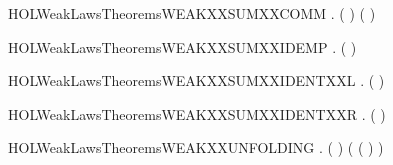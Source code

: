 \newcommand{\HOLWeakLawsTheoremsWEAKXXSUMXXASSOCXXR}{\UseVerbatim{HOLWeakLawsTheoremsWEAKXXSUMXXASSOCXXR}}
\begin{SaveVerbatim}{HOLWeakLawsTheoremsWEAKXXSUMXXCOMM}
\HOLTokenTurnstile{} \HOLSymConst{\HOLTokenForall{}} .  ( \HOLSymConst{\ensuremath{+}} ) ( \HOLSymConst{\ensuremath{+}} )
\end{SaveVerbatim}
\newcommand{\HOLWeakLawsTheoremsWEAKXXSUMXXCOMM}{\UseVerbatim{HOLWeakLawsTheoremsWEAKXXSUMXXCOMM}}
\begin{SaveVerbatim}{HOLWeakLawsTheoremsWEAKXXSUMXXIDEMP}
\HOLTokenTurnstile{} \HOLSymConst{\HOLTokenForall{}}.  ( \HOLSymConst{\ensuremath{+}} ) 
\end{SaveVerbatim}
\newcommand{\HOLWeakLawsTheoremsWEAKXXSUMXXIDEMP}{\UseVerbatim{HOLWeakLawsTheoremsWEAKXXSUMXXIDEMP}}
\begin{SaveVerbatim}{HOLWeakLawsTheoremsWEAKXXSUMXXIDENTXXL}
\HOLTokenTurnstile{} \HOLSymConst{\HOLTokenForall{}}.  ( \HOLSymConst{\ensuremath{+}} ) 
\end{SaveVerbatim}
\newcommand{\HOLWeakLawsTheoremsWEAKXXSUMXXIDENTXXL}{\UseVerbatim{HOLWeakLawsTheoremsWEAKXXSUMXXIDENTXXL}}
\begin{SaveVerbatim}{HOLWeakLawsTheoremsWEAKXXSUMXXIDENTXXR}
\HOLTokenTurnstile{} \HOLSymConst{\HOLTokenForall{}}.  ( \HOLSymConst{\ensuremath{+}} ) 
\end{SaveVerbatim}
\newcommand{\HOLWeakLawsTheoremsWEAKXXSUMXXIDENTXXR}{\UseVerbatim{HOLWeakLawsTheoremsWEAKXXSUMXXIDENTXXR}}
\begin{SaveVerbatim}{HOLWeakLawsTheoremsWEAKXXUNFOLDING}
\HOLTokenTurnstile{} \HOLSymConst{\HOLTokenForall{}} .  (  ) (  (  ) )
\end{SaveVerbatim}
\newcommand{\HOLWeakLawsTheoremsWEAKXXUNFOLDING}{\UseVerbatim{HOLWeakLawsTheoremsWEAKXXUNFOLDING}}
